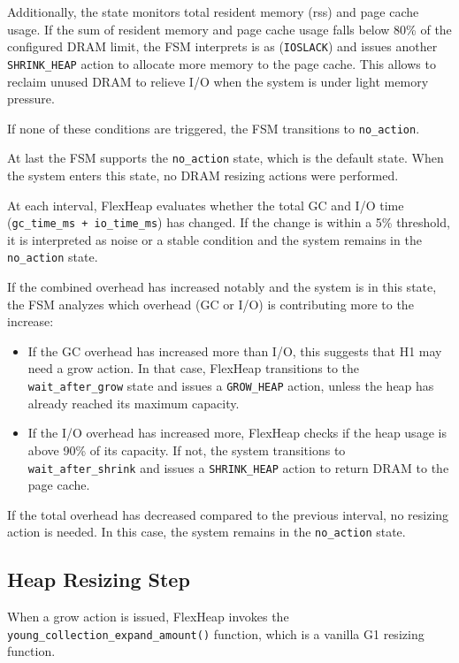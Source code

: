 Additionally, the state monitors total resident memory (rss) and page cache usage.
If the sum of resident memory and page cache usage falls below 80\% 
of the configured DRAM limit, the FSM interprets is as (\texttt{IOSLACK}) and 
issues another \texttt{SHRINK\_HEAP} action to allocate more memory to the page cache. This allows 
to reclaim unused DRAM to relieve I/O when the system is under light memory pressure.

If none of these conditions are triggered, the FSM 
transitions to \texttt{no\_action}.

At last the FSM supports the \texttt{no\_action} state, which is the default state.
When the system enters this state, no DRAM resizing actions were performed.

At each interval, FlexHeap evaluates whether the total GC and I/O time (\texttt{gc\_time\_ms + io\_time\_ms}) has
changed. If the change is within a 5\% threshold, it is interpreted 
as noise or a stable condition and the system remains in the \texttt{no\_action} state.

If the combined overhead has increased notably and the system is in this state, the FSM analyzes which overhead (GC or I/O) is 
contributing more to the increase:
\begin{itemize}
  \item If the GC overhead has increased more than I/O, this suggests that H1 may need a grow action. 
  In that case, FlexHeap transitions to the \texttt{wait\_after\_grow} state and issues a \texttt{GROW\_HEAP} action, 
  unless the heap has already reached its maximum capacity.

  \item If the I/O overhead has increased more, FlexHeap checks if the heap usage is above 90\% of 
  its capacity. If not, the system transitions to \texttt{wait\_after\_shrink} and issues a \texttt{SHRINK\_HEAP} 
  action to return DRAM to the page cache.
\end{itemize}

If the total overhead has decreased compared to the previous interval, no resizing action is needed. In this case, 
the system remains in the \texttt{no\_action} state.
 
\subsection{Heap Resizing Step}

When a grow action is issued, FlexHeap invokes the \texttt{young\_collection\_expand\_amount()} function, 
which is a vanilla G1 resizing function.

